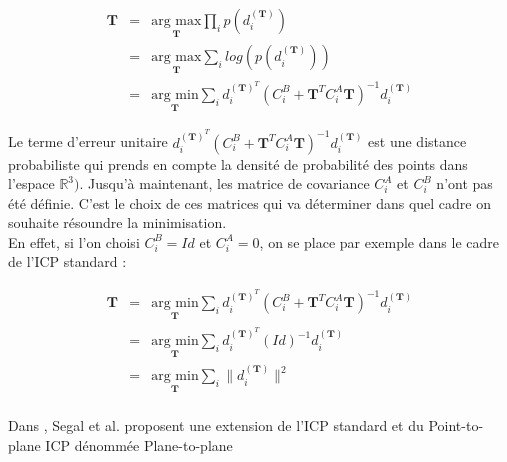\begin{eqnarray}
\mathbf{T} &=& \underset{\mathbf{T}}{\text{arg max}} \prod_{i} p(d_{i}^{(\mathbf{T})}) \\
&=& \underset{\mathbf{T}}{\text{arg max}} \sum_{i} log(p(d_{i}^{(\mathbf{T})})) \\
&=& \underset{\mathbf{T}}{\text{arg min}} \sum_{i} d_{i}^{(\mathbf{T})^T}(C_{i}^B + \mathbf{T}^{T}C_{i}^{A}\mathbf{T})^{-1}d_{i}^{(\mathbf{T})}
\end{eqnarray}

Le terme d'erreur unitaire $d_{i}^{(\mathbf{T})^T}(C_{i}^B+\mathbf{T}^{T}C_{i}^{A}\mathbf{T})^{-1}d_{i}^{(\mathbf{T})}$  est une distance probabiliste qui prends en compte la densité de probabilité des points dans l'espace $\mathbb{R}^{3})$. Jusqu'à maintenant, les matrice de covariance $C_{i}^A$ et $C_{i}^B$ n'ont pas été définie. C'est le choix de ces matrices qui va déterminer dans quel cadre on souhaite résoundre la minimisation.\\

En effet, si l'on choisi $C_{i}^B = Id$ et $C_{i}^A = 0$, on se place par exemple dans le cadre de l'ICP standard :

\begin{eqnarray}
\mathbf{T} &=& \underset{\mathbf{T}}{\text{arg min}} \sum_{i} d_{i}^{(\mathbf{T})^T}(C_{i}^B + \mathbf{T}^{T}C_{i}^{A}\mathbf{T})^{-1}d_{i}^{(\mathbf{T})}\\
&=& \underset{\mathbf{T}}{\text{arg min}} \sum_{i} d_{i}^{(\mathbf{T})^T}(Id)^{-1}d_{i}^{(\mathbf{T})}\\
&=& \underset{\mathbf{T}}{\text{arg min}} \sum_{i} \|d_{i}^{(\mathbf{T})}\|^2\\
\end{eqnarray}

Dans \cite{bib_gicp}, Segal et al. proposent une extension de l'ICP standard et du Point-to-plane ICP  dénommée Plane-to-plane 

